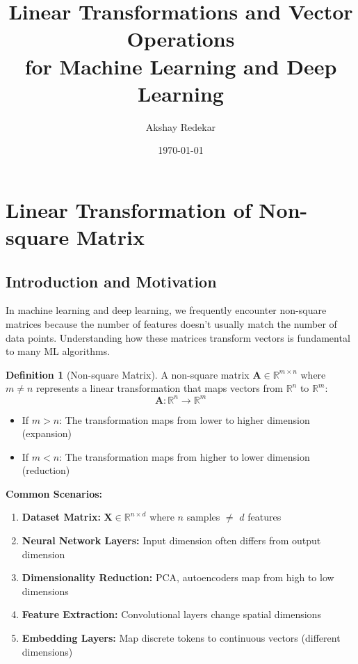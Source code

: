 \documentclass[12pt,a4paper]{article}
\title{\textbf{Linear Transformations and Vector Operations \\ for Machine Learning and Deep Learning}}
\author{Akshay Redekar}
\date{\today}
\theoremstyle{definition}
\newtheorem{definition}{Definition}[section]
\begin{document}
\maketitle
\tableofcontents
\newpage

\section{Linear Transformation of Non-square Matrix}

\subsection{Introduction and Motivation}

In machine learning and deep learning, we frequently encounter non-square matrices because the number of features doesn't usually match the number of data points. Understanding how these matrices transform vectors is fundamental to many ML algorithms.

\begin{definition}[Non-square Matrix]
A non-square matrix $\mathbf{A} \in \mathbb{R}^{m \times n}$ where $m \neq n$ represents a linear transformation that maps vectors from $\mathbb{R}^n$ to $\mathbb{R}^m$:
\begin{equation}
\mathbf{A}: \mathbb{R}^n \to \mathbb{R}^m
\end{equation}

\begin{itemize}
    \item If $m > n$: The transformation maps from lower to higher dimension (expansion)
    \item If $m < n$: The transformation maps from higher to lower dimension (reduction)
\end{itemize}
\end{definition}

\begin{tcolorbox}[enhanced,breakable,colback=blue!5!white,colframe=blue!75!black,title=Why Non-square Matrices in ML/DL?]
\textbf{Common Scenarios:}
\begin{enumerate}
    \item \textbf{Dataset Matrix:} $\mathbf{X} \in \mathbb{R}^{n \times d}$ where $n$ samples $\neq$ $d$ features
    \item \textbf{Neural Network Layers:} Input dimension often differs from output dimension
    \item \textbf{Dimensionality Reduction:} PCA, autoencoders map from high to low dimensions
    \item \textbf{Feature Extraction:} Convolutional layers change spatial dimensions
    \item \textbf{Embedding Layers:} Map discrete tokens to continuous vectors (different dimensions)
\end{enumerate}
\end{tcolorbox}
\end{document}

